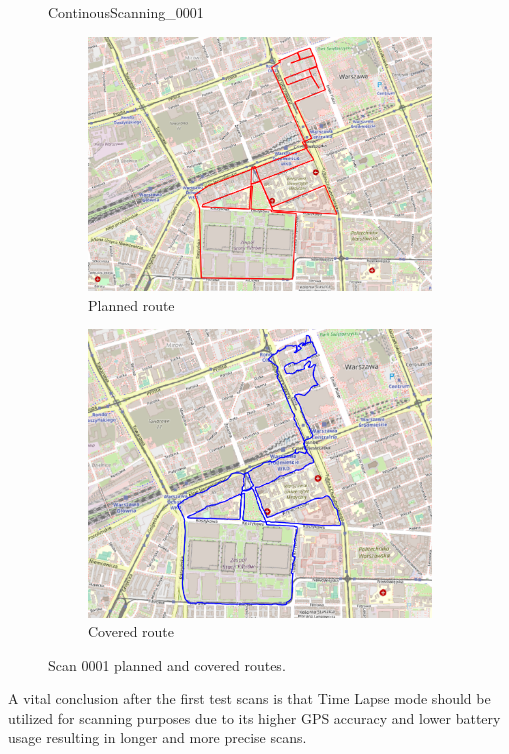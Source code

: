 \documentclass[a4paper,12pt]{book}
\begin{document}
\begin{enumerate}
\begin{figure}[H]
		\caption{ContinousScanning\_0001}
	\end{figure}
	\begin{figure}[H]
		\centering
		\begin{subfigure}{.88\textwidth}
			\centering
			\includegraphics[width=1\linewidth]{route_p1}
			\caption{Planned route}
			\label{fig:a1}
		\end{subfigure}%
		\linebreak
		\begin{subfigure}{.88\textwidth}
			\centering
			\includegraphics[width=1\linewidth]{route_c1}
			\caption{Covered route}
			\label{fig:b1}
		\end{subfigure}
		\caption{Scan 0001 planned and covered routes.}
		\label{fig:fig1}
	\end{figure}
\end{enumerate}
A vital conclusion after the first test scans is that Time Lapse mode should be utilized for scanning purposes due to its higher GPS accuracy and lower battery usage resulting in longer and more precise scans.
\end{document}
